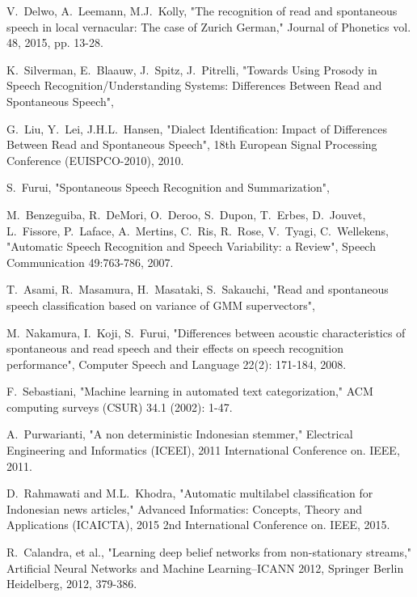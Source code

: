 \documentclass[conference]{IEEEtran}
\begin{document}
\begin{thebibliography}{1}

V.~Delwo, A.~Leemann, M.J.~Kolly,
    "The recognition of read and spontaneous speech in local vernacular: The case of Zurich German,"
    Journal of Phonetics vol. 48, 2015, pp. 13-28.

K.~Silverman, E.~Blaauw, J.~Spitz, J.~Pitrelli,
    "Towards Using Prosody in Speech Recognition/Understanding Systems: Differences Between Read and Spontaneous Speech",

G.~Liu, Y.~Lei, J.H.L.~Hansen,
    "Dialect Identification: Impact of Differences Between Read and Spontaneous Speech",
    18th European Signal Processing Conference (EUISPCO-2010), 2010.

S.~Furui,
    "Spontaneous Speech Recognition and Summarization",

M.~Benzeguiba, R.~DeMori, O.~Deroo, S.~Dupon, T.~Erbes, D.~Jouvet, L.~Fissore, P.~Laface, A.~Mertins, C.~Ris, R.~Rose, V.~Tyagi, C.~Wellekens,
	"Automatic Speech Recognition and Speech Variability: a Review",
	Speech Communication 49:763-786, 2007.

T.~Asami, R.~Masamura, H.~Masataki, S.~Sakauchi,
    "Read and spontaneous speech classification based on variance of GMM supervectors",
    
M.~Nakamura, I.~Koji, S.~Furui,
    "Differences between acoustic characteristics of spontaneous and read speech and their effects on speech recognition performance",
    Computer Speech and Language 22(2): 171-184, 2008.

F.~Sebastiani,
    "Machine learning in automated text categorization,"
    ACM computing surveys (CSUR) 34.1 (2002): 1-47.

A.~Purwarianti,
    "A non deterministic Indonesian stemmer,"
    Electrical Engineering and Informatics (ICEEI),
    2011 International Conference on. IEEE, 2011.

D.~Rahmawati and M.L.~Khodra,
    "Automatic multilabel classification for Indonesian news articles,"
    Advanced Informatics: Concepts, Theory and Applications (ICAICTA),
    2015 2nd International Conference on. IEEE, 2015.

R.~Calandra, et al.,
    "Learning deep belief networks from non-stationary streams,"
    Artificial Neural Networks and Machine Learning–ICANN 2012,
    Springer Berlin Heidelberg, 2012, 379-386.


\end{thebibliography}
\end{document}

